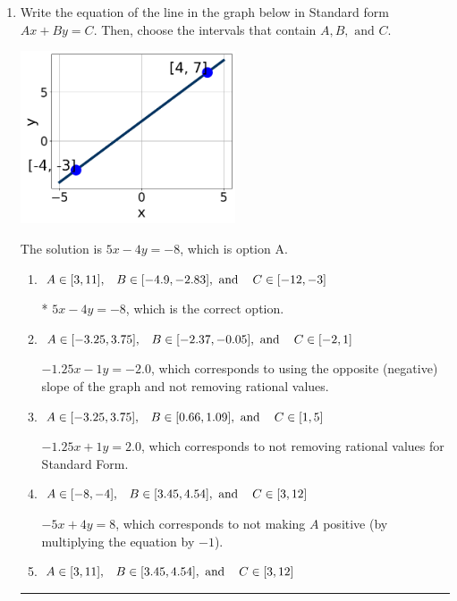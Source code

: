 \documentclass{extbook}[14pt]
\newcommand{\litem}[1]{\item #1

\rule{\textwidth}{0.4pt}}
\begin{document}
\begin{enumerate}\litem{
Write the equation of the line in the graph below in Standard form $Ax+By=C$. Then, choose the intervals that contain $A, B, \text{ and } C$.

\begin{center}
    \includegraphics[width=0.5\textwidth]{../Figures/linearGraphToStandardC.png}
\end{center}


The solution is \( 5x - 4y = -8 \), which is option A.\begin{enumerate}[label=\Alph*.]
\item \( A \in [3, 11], \hspace{3mm} B \in [-4.9, -2.83], \text{ and } \hspace{3mm} C \in [-12, -3] \)

* $5x - 4y = -8$, which is the correct option.
\item \( A \in [-3.25, 3.75], \hspace{3mm} B \in [-2.37, -0.05], \text{ and } \hspace{3mm} C \in [-2, 1] \)

 $-1.25x - 1y = -2.0$, which corresponds to using the opposite (negative) slope of the graph and not removing rational values.
\item \( A \in [-3.25, 3.75], \hspace{3mm} B \in [0.66, 1.09], \text{ and } \hspace{3mm} C \in [1, 5] \)

 $-1.25x + 1y = 2.0$, which corresponds to not removing rational values for Standard Form.
\item \( A \in [-8, -4], \hspace{3mm} B \in [3.45, 4.54], \text{ and } \hspace{3mm} C \in [3, 12] \)

 $-5x + 4y = 8$, which corresponds to not making $A$ positive (by multiplying the equation by $-1$).
\item \( A \in [3, 11], \hspace{3mm} B \in [3.45, 4.54], \text{ and } \hspace{3mm} C \in [3, 12] \)


\end{enumerate}}
\end{enumerate}
\end{document}
